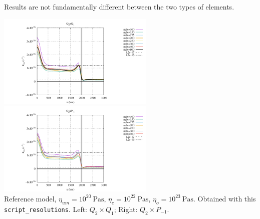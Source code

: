 Results are not fundamentally different between the two types of elements.
\begin{center}
\includegraphics[width=7.5cm]{python_codes/fieldstone_143/results/resolutions/fig_resolutions}
\includegraphics[width=7.5cm]{python_codes/fieldstone_143/results/resolutions_q2pm1/fig_resolutions}\\
{\captionfont 
Reference model, $\eta_{um}=10^{20}~\si{\pascal\second}$, 
$\eta_c=10^{22}~\si{\pascal\second}$, $\eta_o=10^{23}~\si{\pascal\second}$. 
Obtained with this  {\tt script\_resolutions}.
Left: $Q_2\times Q_1$; Right: $Q_2\times P_{-1}$.}
\end{center}

\newpage

